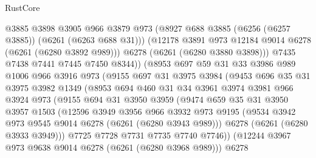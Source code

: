 \begin{lexlean}{RustCore}
\begin{coremodule}
                      @3885
                      @3898
                      @3905
                      @966
                      @3879
                      @973
                      (@8927 @688 @3885 (@6256 (@6257 @3885)) (@6261 (@6263 @688 @31)))
                      (@12178 @3891 @973 @12184 @9014 @6278 (@6261 (@6280 @3892 @989)))
                      @6278
                      (@6261 (@6280 @3880 @3898)))
                    @7435
                    @7438
                    @7441
                    @7445
                    @7450
                    @8344))
                (@8953
                  @697
                  @59
                  @31
                  @33
                  @3986
                  @989
                  @1006
                  @966
                  @3916
                  @973
                  (@9155
                    @697
                    @31
                    @3975
                    @3984
                    (@9453
                      @696
                      @35
                      @31
                      @3975
                      @3982
                      @1349
                      (@8953
                        @694
                        @460
                        @31
                        @34
                        @3961
                        @3974
                        @3981
                        @966
                        @3924
                        @973
                        (@9155
                          @694
                          @31
                          @3950
                          @3959
                          (@9474
                            @659
                            @35
                            @31
                            @3950
                            @3957
                            @1503
                            (@12596
                              @3949
                              @3956
                              @966
                              @3932
                              @973
                              @9195
                              (@9534 @3942 @973 @9545 @9014 @6278 (@6261 (@6280 @3943 @989)))
                              @6278
                              (@6261 (@6280 @3933 @3949)))
                            @7725
                            @7728
                            @7731
                            @7735
                            @7740
                            @7746))
                        (@12244 @3967 @973 @9638 @9014 @6278 (@6261 (@6280 @3968 @989)))
                        @6278

\end{coremodule}
\end{lexlean}
